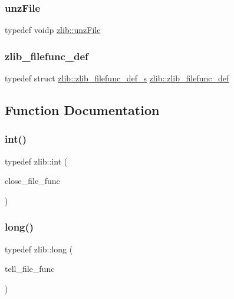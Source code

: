 \mbox{\label{namespacezlib_a48c1eb530e72d2132ea9cb6648f4047e}} 
\subsubsection{\texorpdfstring{unz\+File}{unzFile}}
{\footnotesize\ttfamily typedef voidp \hyperlink{namespacezlib_a48c1eb530e72d2132ea9cb6648f4047e}{zlib\+::unz\+File}}

\mbox{\label{namespacezlib_a4ada5a935fba7f21209bc451eb7ffbc7}} 
\subsubsection{\texorpdfstring{zlib\+\_\+filefunc\+\_\+def}{zlib\_filefunc\_def}}
{\footnotesize\ttfamily typedef struct \hyperlink{structzlib_1_1zlib__filefunc__def__s}{zlib\+::zlib\+\_\+filefunc\+\_\+def\+\_\+s}  \hyperlink{namespacezlib_a4ada5a935fba7f21209bc451eb7ffbc7}{zlib\+::zlib\+\_\+filefunc\+\_\+def}}



\subsection{Function Documentation}
\mbox{\label{namespacezlib_a0c9da18d93722fcf02a354ae2b6ec1ba}} 
\subsubsection{\texorpdfstring{int()}{int()}}
{\footnotesize\ttfamily typedef zlib\+::int (\begin{DoxyParamCaption}\item[{\hyperlink{ioapi_8h_aace96475a6dd2915bc55bc542d7aa8a5}{Z\+C\+A\+L\+L\+B\+A\+CK} $\ast$}]{close\+\_\+file\+\_\+func }\end{DoxyParamCaption})}

\mbox{\label{namespacezlib_a2687cf555d9f1239210afb6f2adcd9a1}} 
\subsubsection{\texorpdfstring{long()}{long()}}
{\footnotesize\ttfamily typedef zlib\+::long (\begin{DoxyParamCaption}\item[{\hyperlink{ioapi_8h_aace96475a6dd2915bc55bc542d7aa8a5}{Z\+C\+A\+L\+L\+B\+A\+CK} $\ast$}]{tell\+\_\+file\+\_\+func }\end{DoxyParamCaption})}

